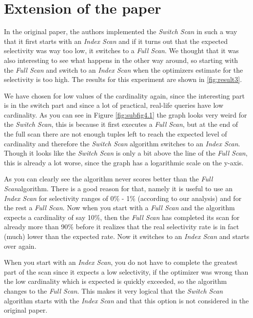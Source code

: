 \documentclass[a4paper,11pt,twoside]{article}
\begin{document}
\section{Extension of the paper}\label{sec:extension}
In the original paper, the authors implemented the \textit{Switch Scan} in such a way that it first starts with an \textit{Index Scan} and if it turns out that the expected selectivity was way too low, it switches to a \textit{Full Scan}. We thought that it was also interesting to see what happens in the other way around, so starting with the \textit{Full Scan} and switch to an \textit{Index Scan} when the optimizers estimate for the selectivity is too high. The results for this experiment are shown in \autoref{fig:result3}.

We have chosen for low values of the cardinality again, since the interesting part is in the switch part and since a lot of practical, real-life queries have low cardinality. As you can see in Figure \autoref{fig:subfig4.1} the graph looks very weird for the \textit{Switch Scan}, this is because it first executes a \textit{Full Scan}, but at the end of the full scan there are not enough tuples left to reach the expected level of cardinality and therefore the \textit{Switch Scan} algorithm switches to an \textit{Index Scan}. Though it looks like the \textit{Switch Scan} is only a bit above the line of the \textit{Full Scan}, this is already a lot worse, since the graph has a logarithmic scale on the y-axis.

As you can clearly see the algorithm never scores better than the \textit{Full Scan}algorithm. There is a good reason for that, namely it is useful to use an \textit{Index Scan} for selectivity ranges of 0$\%$ - 1$\%$ (according to our analysis) and for the rest a \textit{Full Scan}. Now when you start with a \textit{Full Scan} and the algorithm expects a cardinality of say 10$\%$, then the \textit{Full Scan} has completed its scan for already more than 90$\%$ before it realizes that the real selectivity rate is in fact (much) lower than the expected rate. Now it switches to an \textit{Index Scan} and starts over again. 

When you start with an \textit{Index Scan}, you do not have to complete the greatest part of the scan since it expects a low selectivity, if the optimizer was wrong than the low cardinality which is expected is quickly exceeded, so the algorithm changes to the \textit{Full Scan}. This makes it very logical that the \textit{Switch Scan} algorithm starts with the \textit{Index Scan} and that this option is not considered in the original paper.
\end{document}
